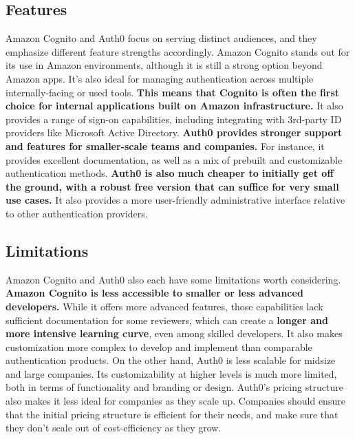 \subsection*{Features}
Amazon Cognito and Auth0 focus on serving distinct audiences, and they emphasize different feature strengths accordingly. 
Amazon Cognito stands out for its use in Amazon environments, although it is still a strong option beyond Amazon apps. It’s also ideal for managing authentication across multiple internally-facing or used tools. \textbf{This means that Cognito is often the first choice for internal applications built on Amazon infrastructure.} It also provides a range of sign-on capabilities, including integrating with 3rd-party ID providers like Microsoft Active Directory. 
\textbf{Auth0 provides stronger support and features for smaller-scale teams and companies.} For instance, it provides excellent documentation, as well as a mix of prebuilt and customizable authentication methods. \textbf{Auth0 is also much cheaper to initially get off the ground, with a robust free version that can suffice for very small use cases.} It also provides a more user-friendly administrative interface relative to other authentication providers. 
\subsection*{Limitations}
Amazon Cognito and Auth0 also each have some limitations worth considering. 
\textbf{Amazon Cognito is less accessible to smaller or less advanced developers.} While it offers more advanced features, those capabilities lack sufficient documentation for some reviewers, which can create a \textbf{longer and more intensive learning curve}, even among skilled developers. It also makes customization more complex to develop and implement than comparable authentication products.
On the other hand, Auth0 is less scalable for midsize and large companies. Its customizability at higher levels is much more limited, both in terms of functionality and branding or design. Auth0’s pricing structure also makes it less ideal for companies as they scale up. Companies should ensure that the initial pricing structure is efficient for their needs, and make sure that they don’t scale out of cost-efficiency as they grow.  

